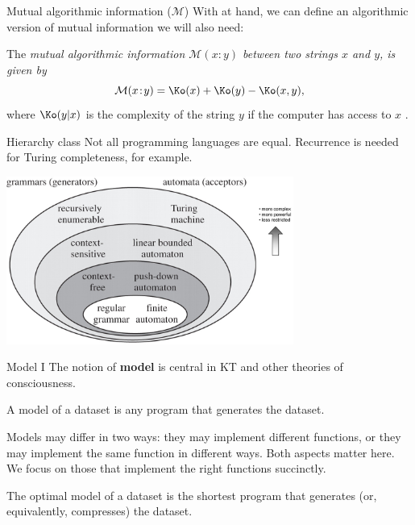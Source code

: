 \begin{frame}[label=intro3]{Mutual algorithmic information ($\mathcal M$)}
With 
\K at hand, we can define an algorithmic version of mutual information we will also need: \vfill

\begin{definition}
The {\em mutual algorithmic information  $\mathcal M(x:y)$ between two strings $x$ and $y$, is given by  }
$$
\mathcal M(x \!:\!y) = \Ko(x) +\Ko(y)- \Ko(x,y),
$$
where $\Ko(y|x)$ is the complexity of the string $y$ if the computer has access to $x$ \citep{Li:1997aa, Grunwald:2004aa}.  
\end{definition}
\end{frame}

\begin{frame}[label=ladila]{Hierarchy class \citep{Fitch2014}}
Not all programming languages are equal. Recurrence is needed for Turing completeness, for example. 
 \begin{center}%
  \includegraphics[height=5.5cm]{img/chomsky.jpg}
  \end{center}
\end{frame}

\begin{frame}[label=ladila]{Model I}
The notion of {\bf model} is central in KT and other theories of consciousness. \vfill

 
 \begin{definition}[Model]
 A  model  of a dataset is any program that generates the dataset. 
 \end{definition}
Models may differ in two ways: they may implement different functions, or they may implement the same function in different ways. Both aspects matter here.  We focus on those that implement the right functions succinctly. \vfill 
 
\begin{definition}
The optimal model of a dataset is the shortest program that generates (or, equivalently, compresses) the dataset.
\end{definition}
\end{frame}


